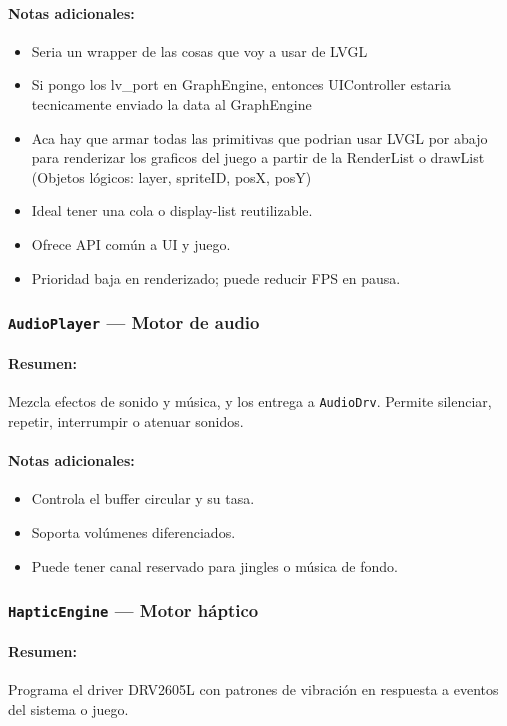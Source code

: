\documentclass[11pt,a4paper]{article}
\begin{document}
\paragraph{Notas adicionales:}
\begin{itemize}
  \item Seria un wrapper de las cosas que voy a usar de LVGL
  \item Si pongo los lv\_port en GraphEngine, entonces UIController estaria tecnicamente enviado la data al GraphEngine
  \item Aca hay que armar todas las primitivas que podrian usar LVGL por abajo para renderizar los graficos del juego a partir de la RenderList o drawList (Objetos lógicos: {layer, spriteID, posX, posY})
  \item Ideal tener una cola o display-list reutilizable.
  \item Ofrece API común a UI y juego.
  \item Prioridad baja en renderizado; puede reducir FPS en pausa.
\end{itemize}

\subsubsection{\texttt{AudioPlayer} — Motor de audio}
\paragraph{Resumen:} Mezcla efectos de sonido y música, y los entrega a \texttt{AudioDrv}. Permite silenciar, repetir, interrumpir o atenuar sonidos.
\paragraph{Notas adicionales:}
\begin{itemize}
  \item Controla el buffer circular y su tasa.
  \item Soporta volúmenes diferenciados.
  \item Puede tener canal reservado para jingles o música de fondo.
\end{itemize}

\subsubsection{\texttt{HapticEngine} — Motor háptico}
\paragraph{Resumen:} Programa el driver DRV2605L con patrones de vibración en respuesta a eventos del sistema o juego.
\end{document}

